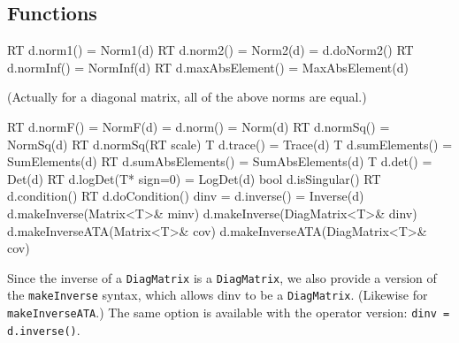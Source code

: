 \documentclass[twoside,letterpaper,11pt]{article}
\renewcommand{\tt}[1]{{\lstinline {#1}}}
\begin{document}
\subsection{Functions}
\label{DiagMatrix_Functions}

\begin{tmvcode}
RT d.norm1() = Norm1(d)
RT d.norm2() = Norm2(d) = d.doNorm2()
RT d.normInf() = NormInf(d)
RT d.maxAbsElement() = MaxAbsElement(d)
\end{tmvcode}
(Actually for a diagonal matrix, all of the above norms are equal.)
\begin{tmvcode}
RT d.normF() = NormF(d) = d.norm() = Norm(d)
RT d.normSq() = NormSq(d)
RT d.normSq(RT scale)
T d.trace() = Trace(d)
T d.sumElements() = SumElements(d)
RT d.sumAbsElements() = SumAbsElements(d)
T d.det() = Det(d)
RT d.logDet(T* sign=0) = LogDet(d)
bool d.isSingular()
RT d.condition()
RT d.doCondition()
dinv = d.inverse() = Inverse(d)
d.makeInverse(Matrix<T>& minv)
d.makeInverse(DiagMatrix<T>& dinv)
d.makeInverseATA(Matrix<T>& cov)
d.makeInverseATA(DiagMatrix<T>& cov)
\end{tmvcode}
Since the inverse of a \tt{DiagMatrix} is a \tt{DiagMatrix},
we also provide a version of the \tt{makeInverse} syntax, which allows dinv
to be a \tt{DiagMatrix}.  (Likewise for \tt{makeInverseATA}.)  The same option is 
available with the operator version: \tt{dinv = d.inverse()}.
\end{document}
